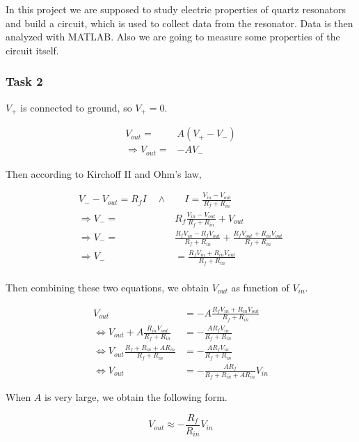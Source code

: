 \documentclass[12pt]{article}
\begin{document}
In this project we are supposed to study electric properties of quartz resonators and build a circuit, which is used to collect data from the resonator. Data is then analyzed with MATLAB. Also we are going to measure some properties of the circuit itself.

\subsubsection{Task 2} \label{sec:voltamp}

$V_+$ is connected to ground, so $V_+ = 0$.

\begin{align*}
V_{out} =& A(V_+ - V_-) \\
\Rightarrow V_{out} =& -AV_-
\end{align*}

Then according to Kirchoff II and Ohm's law,

\begin{align*}
V_- - V_{out} = R_f I \quad \wedge & \quad I = \frac{V_{in} - V_{out}}{R_f + R_{in}} \\
\Rightarrow V_- =& R_f \frac{V_{in} - V_{out}}{R_f + R_{in}} + V_{out} \\
\Rightarrow V_- =& \frac{R_f V_{in} - R_f V_{out}}{R_f + R_{in}} + \frac{R_f V_{out} + R_{in} V_{out}}{R_f + R_{in}} \\
\Rightarrow V_- &= \frac{R_f V_{in} + R_{in} V_{out}}{R_f + R_{in}} \\
\end{align*}

Then combining these two equations, we obtain $V_{out}$ as function of $V_{in}$.

\begin{align*}
V_{out} &= -A\frac{R_f V_{in} + R_{in} V_{out}}{R_f + R_{in}} \\
\Leftrightarrow V_{out} + A\frac{R_{in} V_{out}}{R_f + R_{in}} &= -\frac{A R_f V_{in}}{R_f + R_{in}} \\
\Leftrightarrow V_{out}\frac{R_f + R_{in} + A R_{in}}{R_f + R_{in}} &= -\frac{A R_f V_{in}}{R_f + R_{in}} \\
\Leftrightarrow V_{out} &= -\frac{A R_f}{R_f + R_{in} + A R_{in}} V_{in}
\end{align*}

When $A$ is very large, we obtain the following form.

\begin{equation*}
V_{out} \approx -\frac{R_f}{R_{in}} V_{in}
\end{equation*}
\end{document}
